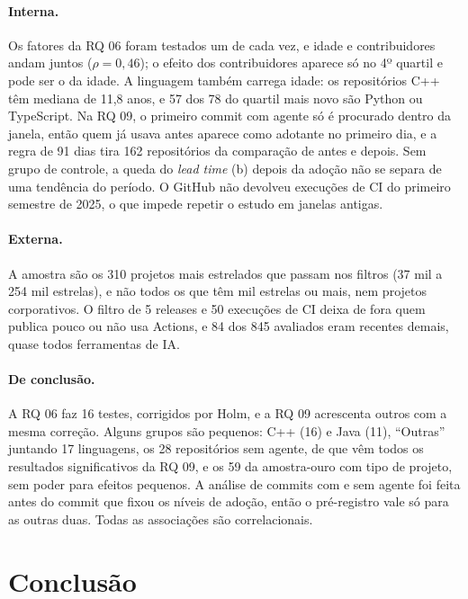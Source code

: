 \documentclass[12pt]{article}
\begin{document}
\paragraph{Interna.} Os fatores da RQ 06 foram testados um de cada vez, e idade e contribuidores
andam juntos ($\rho = 0{,}46$); o efeito dos contribuidores aparece só no 4º quartil e pode ser o da
idade. A linguagem também carrega idade: os repositórios C++ têm mediana de 11,8 anos, e 57 dos 78 do
quartil mais novo são Python ou TypeScript. Na RQ 09, o primeiro commit com agente só é procurado
dentro da janela, então quem já usava antes aparece como adotante no primeiro dia, e a regra de 91
dias tira 162 repositórios da comparação de antes e depois. Sem grupo de controle, a queda do
\textit{lead time} (b) depois da adoção não se separa de uma tendência do período. O GitHub não
devolveu execuções de CI do primeiro semestre de 2025, o que impede repetir o estudo em janelas antigas.

\paragraph{Externa.} A amostra são os 310 projetos mais estrelados que passam nos filtros (37 mil a
254 mil estrelas), e não todos os que têm mil estrelas ou mais, nem projetos corporativos. O filtro de
5 releases e 50 execuções de CI deixa de fora quem publica pouco ou não usa Actions, e 84 dos 845
avaliados eram recentes demais, quase todos ferramentas de IA.

\paragraph{De conclusão.} A RQ 06 faz 16 testes, corrigidos por Holm, e a RQ 09 acrescenta outros
com a mesma correção. Alguns grupos são pequenos: C++ (16) e Java (11), ``Outras'' juntando 17
linguagens, os 28 repositórios sem agente, de que vêm todos os resultados significativos da RQ 09, e
os 59 da amostra-ouro com tipo de projeto, sem poder para efeitos pequenos. A análise de commits com e
sem agente foi feita antes do commit que fixou os níveis de adoção, então o pré-registro vale só para
as outras duas. Todas as associações são correlacionais.

\section{Conclusão}
\end{document}
